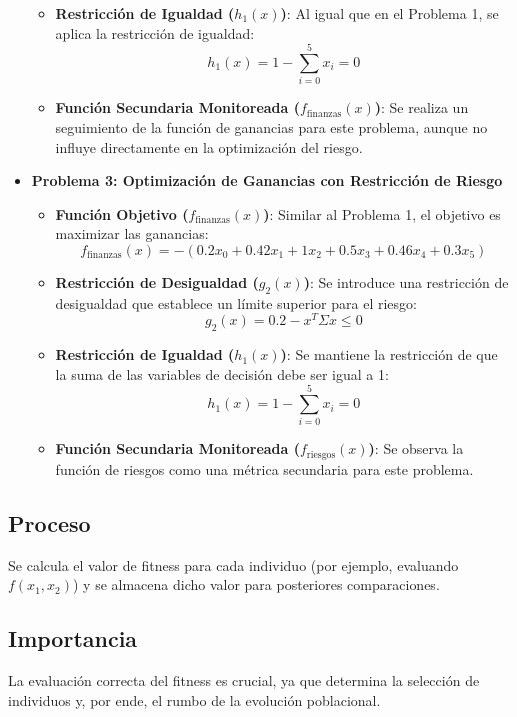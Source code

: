 \begin{itemize}
\begin{itemize}
        \item \textbf{Restricción de Igualdad ($h_1(x)$)}: Al igual que en el Problema 1, se aplica la restricción de igualdad:
        \[
        h_1(x) = 1 - \sum_{i=0}^{5} x_i = 0
        \]

        \item \textbf{Función Secundaria Monitoreada ($f_{\text{finanzas}}(x)$)}: Se realiza un seguimiento de la función de ganancias para este problema, aunque no influye directamente en la optimización del riesgo.
    \end{itemize}

    \item \textbf{Problema 3: Optimización de Ganancias con Restricción de Riesgo}
    \begin{itemize}
        \item \textbf{Función Objetivo ($f_{\text{finanzas}}(x)$)}: Similar al Problema 1, el objetivo es maximizar las ganancias:
        \[
        f_{\text{finanzas}}(x) = -(0.2x_0 + 0.42x_1 + 1x_2 + 0.5x_3 + 0.46x_4 + 0.3x_5)
        \]

        \item \textbf{Restricción de Desigualdad ($g_2(x)$)}: Se introduce una restricción de desigualdad que establece un límite superior para el riesgo:
        \[
        g_2(x) = 0.2 - x^T \Sigma x \leq 0
        \]

        \item \textbf{Restricción de Igualdad ($h_1(x)$)}: Se mantiene la restricción de que la suma de las variables de decisión debe ser igual a 1:
        \[
        h_1(x) = 1 - \sum_{i=0}^{5} x_i = 0
        \]

        \item \textbf{Función Secundaria Monitoreada ($f_{\text{riesgos}}(x)$)}: Se observa la función de riesgos como una métrica secundaria para este problema.
    \end{itemize}
\end{itemize}

\subsection*{Proceso}
Se calcula el valor de fitness para cada individuo (por ejemplo, evaluando $f(x_1, x_2)$) y se almacena dicho valor para posteriores comparaciones.

\subsection*{Importancia}
La evaluaci\'on correcta del fitness es crucial, ya que determina la selecci\'on de individuos y, por ende, el rumbo de la evoluci\'on poblacional.

